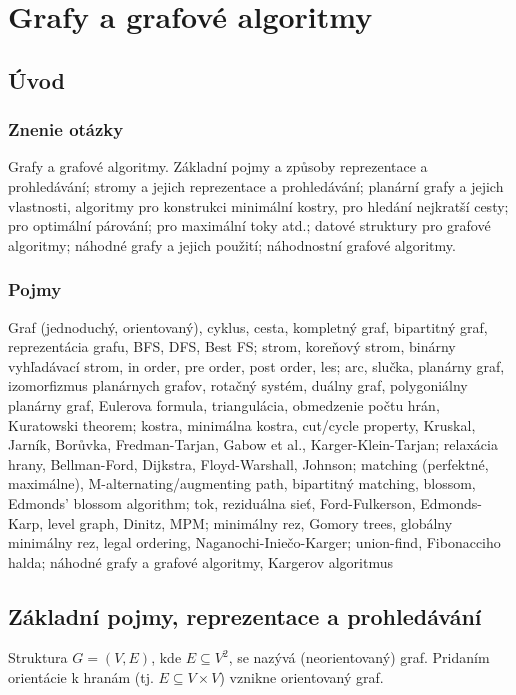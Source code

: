 \section{Grafy a grafové algoritmy}

\subsection{Úvod}
\subsubsection{Znenie otázky}
Grafy a grafové algoritmy. Základní pojmy a způsoby reprezentace
a prohledávání; stromy a jejich reprezentace a prohledávání; planární 
grafy a jejich vlastnosti, algoritmy pro konstrukci minimální kostry, 
pro hledání nejkratší cesty; pro optimální párování; pro maximální 
toky atd.; datové struktury pro grafové algoritmy; náhodné grafy a 
jejich použití; náhodnostní grafové algoritmy.

\subsubsection{Pojmy}
Graf (jednoduchý, orientovaný), cyklus, cesta, kompletný graf,
bipartitný graf, reprezentácia grafu, BFS, DFS, Best FS; strom,
koreňový strom, binárny vyhľadávací strom, in order, pre order,
post order, les; arc, slučka, planárny graf, izomorfizmus planárnych
grafov, rotačný systém, duálny graf, polygoniálny planárny graf,
Eulerova formula, triangulácia, obmedzenie počtu hrán, Kuratowski theorem;
kostra, minimálna kostra, cut/cycle property, Kruskal, Jarník, 
Borůvka, Fredman-Tarjan, Gabow et al., Karger-Klein-Tarjan;
relaxácia hrany, Bellman-Ford, Dijkstra, Floyd-Warshall, Johnson;
matching (perfektné, maximálne), M-alternating/augmenting path,
bipartitný matching, blossom, Edmonds' blossom algorithm;
tok, reziduálna sieť, Ford-Fulkerson, Edmonds-Karp, level graph,
Dinitz, MPM; minimálny rez, Gomory trees, globálny minimálny rez,
legal ordering, Naganochi-Iniečo-Karger;
union-find, Fibonacciho halda; náhodné grafy a grafové algoritmy,
Kargerov algoritmus

\subsection{Základní pojmy, reprezentace a prohledávání}

Struktura $G = (V, E)$, kde $E \subseteq V^2$, se nazývá (neorientovaný) graf.
Pridaním orientácie k hranám (tj. $E \subseteq V \times V$) vznikne orientovaný graf.

